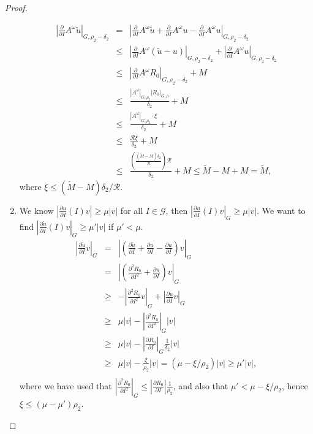\begin{proof}
\begin{enumerate}
$$
\begin{array}{rcl}
 |\frac{\partial}{\partial I} A^\omega \tilde u|_{G,\rho_2-\delta_2}& = &
 |\frac{\partial}{\partial I} A^\omega \tilde u + \frac{\partial}{\partial I} A^\omega u - \frac{\partial}{\partial I} A^\omega  u|_{G,\rho_2-\delta_2} \\
 & \leq & |\frac{\partial}{\partial I} A^\omega (\tilde u - u)|_{G,\rho_2-\delta_2} + |\frac{\partial}{\partial I} A^\omega  u|_{G,\rho_2-\delta_2}\\
 & \leq & |\frac{\partial}{\partial I} A^\omega R_0|_{G,\rho_2-\delta_2} + M \\
 & \leq & \frac{|A^\omega|_{G,\rho_2}|R_0|_{G,\rho}}{\delta_2} + M\\
 & \leq & \frac{|A^\omega|_{G,\rho_2} \cdot \xi}{\delta_2} + M \\
 & \leq & \frac{\mathcal{R}\xi}{\delta_2} + M\\
 & \leq & \displaystyle \frac{(\frac{(\tilde M - M)\delta_2}{\mathcal{R}})\mathcal{R}}{\delta_2} + M \leq \tilde M - M + M = \tilde M,
\end{array}
$$
where $\xi \leq (\tilde M - M)\delta_2/\mathcal{R}$.
\item We know $|\frac{\partial u}{\partial I}(I) v| \geq \mu |v|$ for all $I \in \mathcal{G}$, then $|\frac{\partial u}{\partial I}(I) v|_G \geq \mu|v|$.
We want to find $|\frac{\partial \tilde u}{\partial I} (I) v|_G \geq \mu' |v|$ if $\mu' < \mu$.
$$
\begin{array}{rcl}
 |\frac{\partial \tilde u}{\partial I} v|_G &  = & |(\frac{\partial \tilde u}{\partial I} + \frac{\partial u}{\partial I} - \frac{\partial u}{\partial I})v|_G \\
 & = & |(\frac{\partial^2 R_0}{\partial I^2} + \frac{\partial u}{\partial I})v|_G\\
  & \geq & -|\frac{\partial^2 R_0}{\partial I^2} v|_G + |\frac{\partial u}{\partial I} v|_G\\
  & \geq & \mu|v| - |\frac{\partial^2 R_0}{\partial I^2}|_G|v|\\
  & \geq & \mu|v| - |\frac{\partial R_0}{\partial I}|_G\frac{1}{\delta_2}|v|\\
    & \geq & \mu|v| - \frac{\xi}{\rho_2}|v| = (\mu - \xi/\rho_2)|v| \geq \mu'|v|,\\
\end{array}
$$
where we have used that $|\frac{\partial^2 R_0}{\partial I^2}|_G \leq |\frac{\partial R_0}{\partial I}|\frac{1}{\rho_2}$, and also that $\mu' < \mu -\xi/\rho_2$, hence $\xi \leq (\mu - \mu')\rho_2$.

\end{enumerate}
\end{proof}
